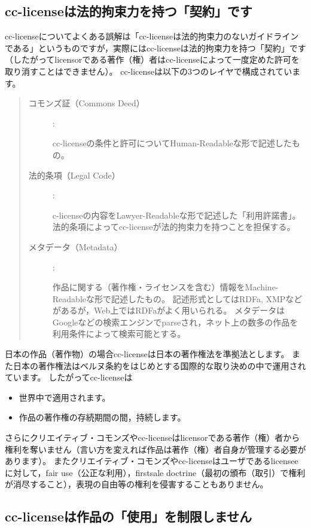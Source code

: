 \documentclass{ltjsarticle}
\begin{document}
\subsection{cc-licenseは法的拘束力を持つ「契約」です}

cc-licenseについてよくある誤解は「cc-licenseは法的拘束力のないガイドラインである」というものですが，実際にはcc-licenseは法的拘束力を持つ「契約」です（したがってlicensorである著作（権）者はcc-licenseによって一度定めた許可を取り消すことはできません）。
cc-licenseは以下の3つのレイヤで構成されています。
\begin{quote}\begin{description}
\item[コモンズ証（Commons Deed）] :\par
    cc-licenseの条件と許可についてHuman-Readableな形で記述したもの。
\item[法的条項（Legal Code）] :\par
    c-licenseの内容をLawyer-Readableな形で記述した「利用許諾書」。
    法的条項によってcc-licenseが法的拘束力を持つことを担保する。
\item[メタデータ（Metadata）] :\par
    作品に関する（著作権・ライセンスを含む）情報をMachine-Readableな形で記述したもの。
    記述形式としてはRDFa, XMPなどがあるが，Web上ではRDFaがよく用いられる。
    メタデータはGoogleなどの検索エンジンでparseされ，ネット上の数多の作品を利用条件によって検索可能とする。
\end{description}\end{quote}

日本の作品（著作物）の場合cc-licenseは日本の著作権法を準拠法とします。
また日本の著作権法はベルヌ条約をはじめとする国際的な取り決めの中で運用されています。
したがってcc-licenseは
\begin{itemize}
\item 世界中で適用されます。
\item 作品の著作権の存続期間の間，持続します。
\end{itemize}
さらにクリエイティブ・コモンズやcc-licenseはlicensorである著作（権）者から権利を奪いません（言い方を変えれば作品は著作（権）者自身が管理する必要があります）。
またクリエイティブ・コモンズやcc-licenseはユーザであるlicenseeに対して，fair use（公正な利用），firstsale doctrine（最初の頒布（取引）で権利が消尽すること），表現の自由等の権利を侵害することもありません。


\subsection{cc-licenseは作品の「使用」を制限しません} \label{sec:fair use}
\end{document}
